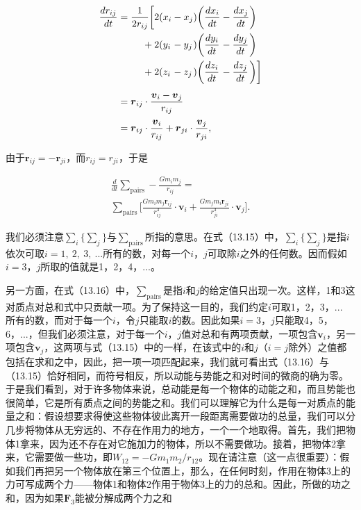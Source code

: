 \documentclass[12pt,oneside]{book}
\providecommand{\ddt}[2]{\frac{d#1}{d#2}}
\providecommand{\FLPvec}[1]{\boldsymbol{#1}}
\providecommand{\FLPF}[0]{\FLPvec{F}}
\providecommand{\FLPr}[0]{\FLPvec{r}}
\providecommand{\FLPv}[0]{\FLPvec{v}}
\begin{document}
\begin{align*}
\ddt{r_{ij}}{t}&=
\begin{alignedat}[t]{5}
\frac{1}{2r_{ij}}\biggl[
&2(x_i&&-x_j&&)\biggl(\ddt{x_i}{t}&&-\ddt{x_j}{t}&&\biggr)\\
{}+{}&2(y_i&&-y_j&&)\biggl(\ddt{y_i}{t}&&-\ddt{y_j}{t}&&\biggr)\\
{}+{}&2(z_i&&-z_j&&)\biggl(\ddt{z_i}{t}&&-\ddt{z_j}{t}&&\biggr)
\biggr]
\end{alignedat}\\[1ex]
&=\FLPr_{ij}\cdot\frac{\FLPv_i-\FLPv_j}{r_{ij}}\\[.5ex]
&=\FLPr_{ij}\cdot\frac{\FLPv_i}{r_{ij}}+
\FLPr_{ji}\cdot\frac{\FLPv_j}{r_{ji}},
\end{align*}


由于$ \FLPr_{ij} = -\FLPr_{ji} $，而$ r_{ij} = r_{ji} $，于是

\begin{equation}
\begin{gathered}
\ddt{}{t}\sum_{\text{pairs}}-\frac{Gm_im_j}{r_{ij}}=\\[2ex]
\sum_{\text{pairs}}\biggl[
\frac{Gm_im_j\FLPr_{ij}}{r_{ij}^3}\cdot\FLPv_i+
\frac{Gm_jm_i\FLPr_{ji}}{r_{ji}^3}\cdot\FLPv_j\biggr].
\end{gathered}
\label{Eq:I:13:16}
\end{equation}

我们必须注意$ \sum\limits_i\{\sum\limits_j\} $与$ \sum\limits_{\text{pairs}} $所指的意思。在式（13.15）中，$\sum\limits_i\{\sum\limits_j\}  $是指$ i $依次可取$ i=1,\ 2, \ 3, \ ... $所有的数，对每一个$ i  $，$ j $可取除$ i $之外的任何数。因而假如$ i=3 $，$ j $所取的值就是1，2，4，...。

另一方面，在式（13.16）中，$\sum\limits_{\text{pairs}}  $是指$ i $和$ j $的给定值只出现一次。这样，1和3这对质点对总和式中只贡献一项。为了保持这一目的，我们约定$ i $可取1，2，3，... 所有的数，而对于每一个$ i $，令$ j $只能取$ i $的数。因此如果$ i=3 $，$ j $只能取4，5，6，...，但我们必须注意，对于每一个$ i $，$ j $值对总和有两项贡献，一项包含$ \FLPv_i $，另一项包含$ \FLPv_j $，这两项与式（13.15）中的一样，在该式中的$ i $和$ j $（$ i = j $除外）之值都包括在求和之中，因此，把一项一项匹配起来，我们就可看出式（13.16）与（13.15）恰好相同，而符号相反，所以动能与势能之和对时间的微商的确为零。于是我们看到，对于许多物体来说，总动能是每一个物体的动能之和，而且势能也很简单，它是所有质点之间的势能之和。我们可以理解它为什么是每一对质点的能量之和：假设想要求得使这些物体彼此离开一段距离需要做功的总量，我们可以分几步将物体从无穷远的、不存在作用力的地方，一个一个地取得。首先，我们把物体1拿来，因为还不存在对它施加力的物体，所以不需要做功。接着，把物体2拿来，它需要做一些功，即$ W_{12}=-Gm_1m_2/r_{12} $。现在请注意（这一点很重要）：假如我们再把另一个物体放在第三个位置上，那么，在任何时刻，作用在物体3上的力可写成两个力——物体1和物体2作用于物体3上的力的总和。因此，所做的功之和，因为如果$ \FLPF_3 $能被分解成两个力之和
\end{document}
